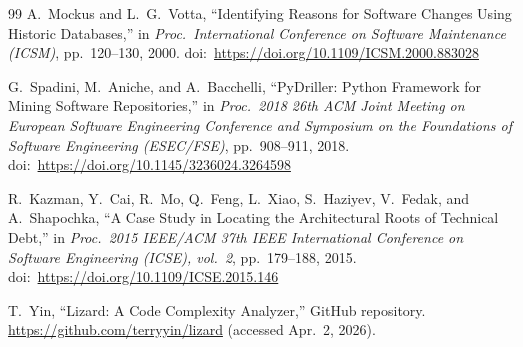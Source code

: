 \documentclass[12pt,a4paper]{article}
\begin{document}
\begin{thebibliography}{99}
A.\ Mockus and L.\ G.\ Votta, ``Identifying Reasons for Software Changes Using Historic Databases,'' in \emph{Proc.\ International Conference on Software Maintenance (ICSM)}, pp.\ 120--130, 2000.
doi:\ \url{https://doi.org/10.1109/ICSM.2000.883028}

G.\ Spadini, M.\ Aniche, and A.\ Bacchelli, ``PyDriller: Python Framework for Mining Software Repositories,'' in \emph{Proc.\ 2018 26th ACM Joint Meeting on European Software Engineering Conference and Symposium on the Foundations of Software Engineering (ESEC/FSE)}, pp.\ 908--911, 2018.
doi:\ \url{https://doi.org/10.1145/3236024.3264598}

R.\ Kazman, Y.\ Cai, R.\ Mo, Q.\ Feng, L.\ Xiao, S.\ Haziyev, V.\ Fedak, and A.\ Shapochka, ``A Case Study in Locating the Architectural Roots of Technical Debt,'' in \emph{Proc.\ 2015 IEEE/ACM 37th IEEE International Conference on Software Engineering (ICSE), vol.\ 2}, pp.\ 179--188, 2015.
doi:\ \url{https://doi.org/10.1109/ICSE.2015.146}

T.\ Yin, ``Lizard: A Code Complexity Analyzer,'' GitHub repository.
\url{https://github.com/terryyin/lizard} (accessed Apr.\ 2, 2026).
\end{thebibliography}
\end{document}
